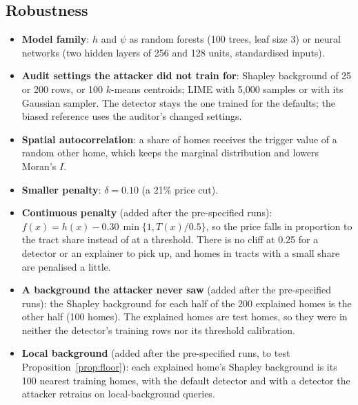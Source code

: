 \documentclass[11pt]{article}
\newcommand{\1}{\mathbf{1}}
\begin{document}
\subsection{Robustness}
\begin{itemize}
  \item \textbf{Model family}: $h$ and $\psi$ as random forests (100 trees, leaf size 3) or neural networks (two hidden
        layers of 256 and 128 units, standardised inputs).
  \item \textbf{Audit settings the attacker did not train for}: Shapley background of 25 or 200 rows, or 100 $k$-means
        centroids; LIME with 5,000 samples or with its Gaussian sampler. The detector stays the one trained for the
        defaults; the biased reference uses the auditor's changed settings.
  \item \textbf{Spatial autocorrelation}: a share of homes receives the trigger value of a random other home, which
        keeps the marginal distribution and lowers Moran's $I$.
  \item \textbf{Smaller penalty}: $\delta = 0.10$ (a 21\% price cut).
  \item \textbf{Continuous penalty} (added after the pre-specified runs): $f(x) = h(x) - 0.30\,\min\{1, T(x)/0.5\}$,
        so the price falls in proportion to the tract share instead of at a threshold. There is no cliff at 0.25
        for a detector or an explainer to pick up, and homes in tracts with a small share are penalised a little.
  \item \textbf{A background the attacker never saw} (added after the pre-specified runs): the Shapley background
        for each half of the 200 explained homes is the other half (100 homes). The explained homes are test homes,
        so they were in neither the detector's training rows nor its threshold calibration.
  \item \textbf{Local background} (added after the pre-specified runs, to test Proposition~\ref{prop:floor}): each
        explained home's Shapley background is its 100 nearest training homes, with the default detector and with a
        detector the attacker retrains on local-background queries.
\end{itemize}
\end{document}
